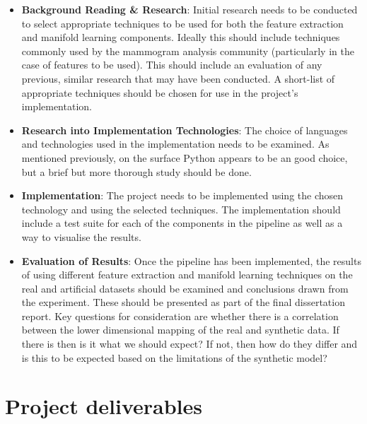 \documentclass[11pt,fleqn,twoside]{article}
\begin{document}
\begin{itemize}
\item \textbf{Background Reading \& Research}: Initial research needs to be conducted to select appropriate techniques to be used for both the feature extraction and manifold learning components. Ideally this should include techniques commonly used by the mammogram analysis community (particularly in the case of features to be used). This should include an evaluation of any previous, similar research that may have been conducted. A short-list of appropriate techniques should be chosen for use in the project's implementation.

\item \textbf{Research into Implementation Technologies}: The choice of languages and technologies used in the implementation needs to be examined. As mentioned previously, on the surface Python appears to be an good choice, but a brief but more thorough study should be done.

\item \textbf{Implementation}: The project needs to be implemented using the chosen technology and using the selected techniques. The implementation should include a test suite for each of the components in the pipeline as well as a way to visualise the results.

\item \textbf{Evaluation of Results}: Once the pipeline has been implemented, the results of using different feature extraction and manifold learning techniques on the real and artificial datasets should be examined and conclusions drawn from the experiment. These should be presented as part of the final dissertation report. Key questions for consideration are whether there is a correlation between the lower dimensional mapping of the real and synthetic data. If there is then is it what we should expect? If not, then how do they differ and is this to be expected based on the limitations of the synthetic model?

\end{itemize}

\section{Project deliverables}
\end{document}
